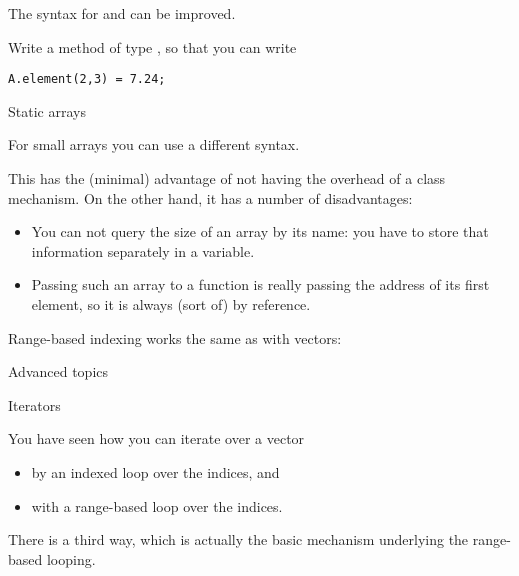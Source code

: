 The syntax for  and  can be improved.
\begin{exercise}
  Write a method  of type , so that you can write
\begin{lstlisting}
A.element(2,3) = 7.24;
\end{lstlisting}
\end{exercise}

 {Static arrays}
\label{sec:staticarray}

For small arrays you can use a different syntax. 


This has the
(minimal) advantage of not having the overhead of a class
mechanism. On the other hand, it has a number of disadvantages:
\begin{itemize}
\item You can not query the size of an array by its name: you have to
  store that information separately in a variable.
\item Passing such an array to a function is really passing the
  address of its first element, so it is always (sort of) by
  reference.
\end{itemize}

Range-based indexing works the same as with vectors:
%

 {Advanced topics}

 {Iterators}
\label{sec:iterator}

You have seen how you can iterate over a vector
\begin{itemize}
\item by an indexed loop over the indices, and
\item with a range-based loop over the indices.
\end{itemize}
There is a third way, which is actually the basic mechanism underlying
the range-based looping.

